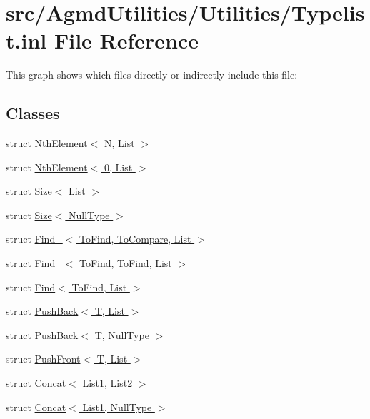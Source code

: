 \hypertarget{_typelist_8inl}{\section{src/\+Agmd\+Utilities/\+Utilities/\+Typelist.inl File Reference}
\label{_typelist_8inl}
}
This graph shows which files directly or indirectly include this file\+:
\subsection*{Classes}
\begin{DoxyCompactItemize}
\item 
struct \hyperlink{struct_nth_element}{Nth\+Element$<$ N, List $>$}
\item 
struct \hyperlink{struct_nth_element_3_010_00_01_list_01_4}{Nth\+Element$<$ 0, List $>$}
\item 
struct \hyperlink{struct_size}{Size$<$ List $>$}
\item 
struct \hyperlink{struct_size_3_01_null_type_01_4}{Size$<$ Null\+Type $>$}
\item 
struct \hyperlink{struct_find__}{Find\+\_\+$<$ To\+Find, To\+Compare, List $>$}
\item 
struct \hyperlink{struct_find___3_01_to_find_00_01_to_find_00_01_list_01_4}{Find\+\_\+$<$ To\+Find, To\+Find, List $>$}
\item 
struct \hyperlink{struct_find}{Find$<$ To\+Find, List $>$}
\item 
struct \hyperlink{struct_push_back}{Push\+Back$<$ T, List $>$}
\item 
struct \hyperlink{struct_push_back_3_01_t_00_01_null_type_01_4}{Push\+Back$<$ T, Null\+Type $>$}
\item 
struct \hyperlink{struct_push_front}{Push\+Front$<$ T, List $>$}
\item 
struct \hyperlink{struct_concat}{Concat$<$ List1, List2 $>$}
\item 
struct \hyperlink{struct_concat_3_01_list1_00_01_null_type_01_4}{Concat$<$ List1, Null\+Type $>$}
\end{DoxyCompactItemize}

